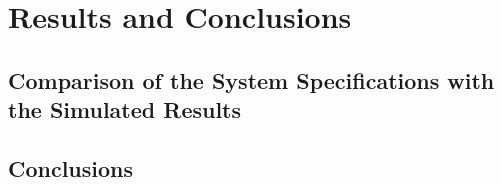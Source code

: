 \documentclass[12pt]{report} %
\begin{document}
\chapter{Results and Conclusions}

\section{Comparison of the System Specifications with the Simulated Results}

\section{Conclusions} %


























\clearpage
{}
\printbibliography



\end{document}
